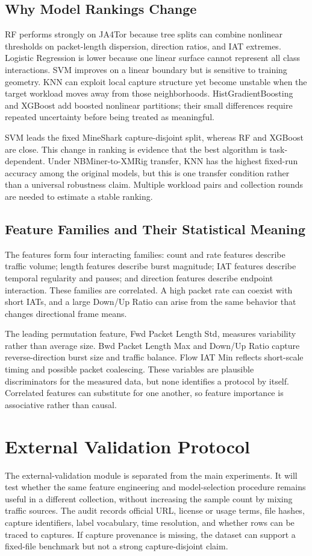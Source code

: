 \documentclass[conference]{IEEEtran}
\begin{document}
\subsection{Why Model Rankings Change}
RF performs strongly on JA4Tor because tree splits can combine nonlinear thresholds on packet-length dispersion, direction ratios, and IAT extremes. Logistic Regression is lower because one linear surface cannot represent all class interactions. SVM improves on a linear boundary but is sensitive to training geometry. KNN can exploit local capture structure yet become unstable when the target workload moves away from those neighborhoods. HistGradientBoosting and XGBoost add boosted nonlinear partitions; their small differences require repeated uncertainty before being treated as meaningful.

SVM leads the fixed MineShark capture-disjoint split, whereas RF and XGBoost are close. This change in ranking is evidence that the best algorithm is task-dependent. Under NBMiner-to-XMRig transfer, KNN has the highest fixed-run accuracy among the original models, but this is one transfer condition rather than a universal robustness claim. Multiple workload pairs and collection rounds are needed to estimate a stable ranking.

\subsection{Feature Families and Their Statistical Meaning}
The features form four interacting families: count and rate features describe traffic volume; length features describe burst magnitude; IAT features describe temporal regularity and pauses; and direction features describe endpoint interaction. These families are correlated. A high packet rate can coexist with short IATs, and a large Down/Up Ratio can arise from the same behavior that changes directional frame means.

The leading permutation feature, Fwd Packet Length Std, measures variability rather than average size. Bwd Packet Length Max and Down/Up Ratio capture reverse-direction burst size and traffic balance. Flow IAT Min reflects short-scale timing and possible packet coalescing. These variables are plausible discriminators for the measured data, but none identifies a protocol by itself. Correlated features can substitute for one another, so feature importance is associative rather than causal.

\section{External Validation Protocol}
The external-validation module is separated from the main experiments. It will test whether the same feature engineering and model-selection procedure remains useful in a different collection, without increasing the sample count by mixing traffic sources. The audit records official URL, license or usage terms, file hashes, capture identifiers, label vocabulary, time resolution, and whether rows can be traced to captures. If capture provenance is missing, the dataset can support a fixed-file benchmark but not a strong capture-disjoint claim.
\end{document}
